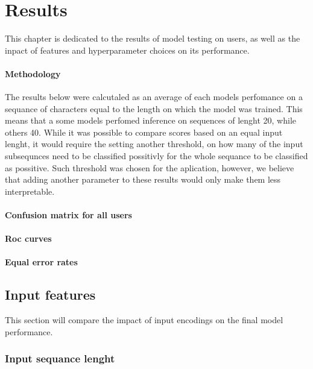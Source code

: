 
\chapter{Results}
This chapter is dedicated to the results of model testing on users, as well as the inpact of features and hyperparameter choices on its performance. 


\subsubsection{Methodology}
The results below were calcutaled as an average of each models perfomance on a sequance of characters equal to the length on which the model was trained.
This means that a some models perfomed inference on sequences of lenght 20, while others 40. While it was possible to compare scores based on an equal input lenght,
it would require the setting another threshold, on how many of the input subsequnces need to be classified possitivly for the whole sequance to be classified as possitive. 
Such threshold was chosen for the aplication, however, we believe that adding another parameter to these results would only make them less interpretable.


\subsubsection{Confusion matrix for all users}

\subsubsection{Roc curves}

\subsubsection{Equal error rates}

\section{Input features}
This section will compare the impact of input encodings on the final model performance.

\subsection{Input sequance lenght}

